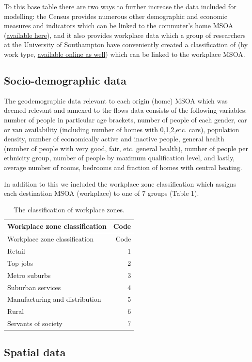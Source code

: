 \documentclass[]{article}
\begin{document}
To this base table there are two ways to further increase the data
included for modelling: the Census provides numerous other demographic
and economic measures and indicators which can be linked to the
commuter's home MSOA
(\href{https://www.nomisweb.co.uk/census/2011/data_finder}{available
here}), and it also provides workplace data which a group of researchers
at the University of Southampton have conveniently created a
classification of (by work type,
\href{http://cowz.geodata.soton.ac.uk/download/}{available online as
well}) which can be linked to the workplace MSOA.

\subsection{Socio-demographic data}\label{socio-demographic-data}

The geodemographic data relevant to each origin (home) MSOA which was
deemed relevant and annexed to the flows data consists of the following
variables: number of people in particular age brackets, number of people
of each gender, car or van availability (including number of homes with
0,1,2,etc. cars), population density, number of economically active and
inactive people, general health (number of people with very good, fair,
etc. general health), number of people per ethnicity group, number of
people by maximum qualification level, and lastly, average number of
rooms, bedrooms and fraction of homes with central heating.

In addition to this we included the workplace zone classification which
assigns each destination MSOA (workplace) to one of 7 groups (Table 1).

\newpage

\begin{longtable}[]{@{}lr@{}}
\caption{The classification of workplace zones.}\tabularnewline
\toprule
Workplace zone classification & Code\tabularnewline
\midrule
\endfirsthead
\toprule
Workplace zone classification & Code\tabularnewline
\midrule
\endhead
Retail & 1\tabularnewline
Top jobs & 2\tabularnewline
Metro suburbs & 3\tabularnewline
Suburban services & 4\tabularnewline
Manufacturing and distribution & 5\tabularnewline
Rural & 6\tabularnewline
Servants of society & 7\tabularnewline
\bottomrule
\end{longtable}

\subsection{Spatial data}\label{spatial-data}
\end{document}
